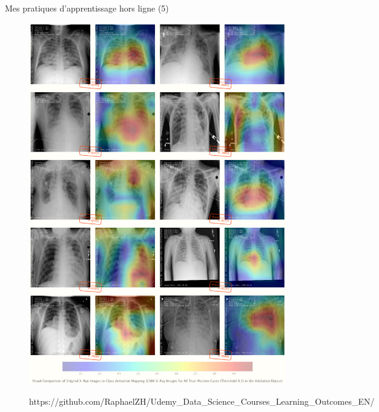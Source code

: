 \documentclass{beamer}
\begin{document}
\begin{frame}[fragile]{Mes pratiques d'apprentissage hors ligne (5)}
\begin{figure}[!htb]
			\endminipage\hfill
			\centering\includegraphics[width=\linewidth]{images/deep_learning_5_2.png}
			\endminipage\hfill
			\vspace{.2em}
			\begin{columns}
				\normalfont\footnotesize{https://github.com/RaphaelZH/Udemy\_Data\_Science\_Courses\_Learning\_Outcomes\_EN/}
			\end{columns}
		\end{figure}
	\end{frame}
	
\end{document}
